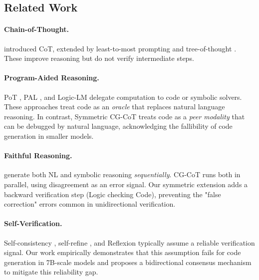 \documentclass[11pt]{article}
\begin{document}
\begin{itemize}
\section{Related Work}
\label{sec:related}

\paragraph{Chain-of-Thought.} \citet{wei2022chain} introduced CoT, extended by least-to-most prompting \citep{zhou2023leasttomost} and tree-of-thought \citep{yao2024tree}. These improve reasoning but do not verify intermediate steps.

\paragraph{Program-Aided Reasoning.} PoT \citep{chen2023program}, PAL \citep{gao2023pal}, and Logic-LM \citep{pan2023logiclm} delegate computation to code or symbolic solvers. These approaches treat code as an \emph{oracle} that replaces natural language reasoning. In contrast, Symmetric CG-CoT treats code as a \emph{peer modality} that can be debugged by natural language, acknowledging the fallibility of code generation in smaller models.

\paragraph{Faithful Reasoning.} \citet{lyu2023faithful} generate both NL and symbolic reasoning \emph{sequentially}. CG-CoT runs both in parallel, using disagreement as an error signal. Our symmetric extension adds a backward verification step (Logic checking Code), preventing the "false correction" errors common in unidirectional verification.

\paragraph{Self-Verification.} Self-consistency \citep{wang2023selfconsistency}, self-refine \citep{madaan2023selfrefine}, and Reflexion \citep{shinn2024reflexion} typically assume a reliable verification signal. Our work empirically demonstrates that this assumption fails for code generation in 7B-scale models and proposes a bidirectional consensus mechanism to mitigate this reliability gap.




\appendix


\end{itemize}
\end{document}
